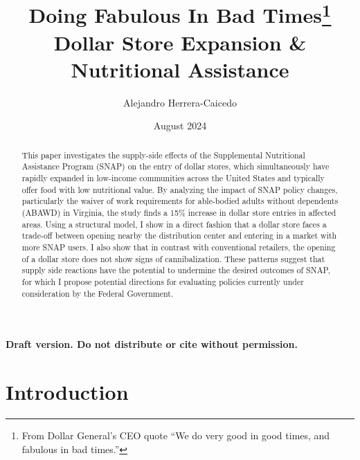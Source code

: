 \documentclass[11.5pt]{article}
\title{Doing Fabulous In Bad Times\footnote{From Dollar General's CEO quote ``We do very good in good times, and fabulous in bad times.''} \\ Dollar Store Expansion \& Nutritional Assistance}
\author{Alejandro Herrera-Caicedo }
\date{August 2024}
\begin{document}
\maketitle
\begin{center}
\textbf{Draft version. Do not distribute or cite without permission.}
\end{center}

\begin{abstract}
    This paper investigates the supply-side effects of the Supplemental Nutritional Assistance Program (SNAP) on the entry of dollar stores, which simultaneously have rapidly expanded in low-income communities across the United States and typically offer food with low nutritional value. By analyzing the impact of SNAP policy changes, particularly the waiver of work requirements for able-bodied adults without dependents (ABAWD) in Virginia, the study finds a 15\% increase in dollar store entries in affected areas. Using a structural model, I show in a direct fashion that a dollar store faces a trade-off between opening nearby the distribution center and entering in a market with more SNAP users. I also show that in contrast with conventional retailers, the opening of a dollar store does not show signs of cannibalization. These patterns suggest that supply side reactions have the potential to undermine the desired outcomes of SNAP, for which I propose potential directions for evaluating policies currently under consideration by the Federal Government.
    
    
    
    
\end{abstract}


\section{Introduction}
\end{document}
